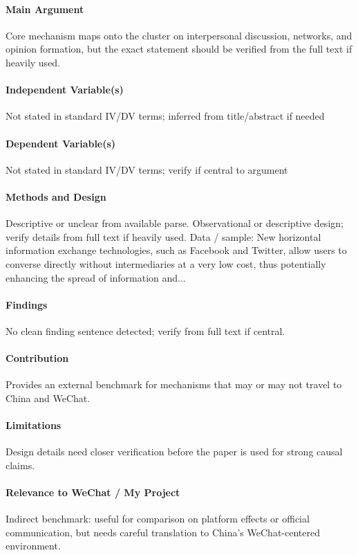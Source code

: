 \documentclass[12pt]{article}
\begin{document}
\paragraph{Main Argument} Core mechanism maps onto the cluster on interpersonal discussion, networks, and opinion formation, but the exact statement should be verified from the full text if heavily used.

\paragraph{Independent Variable(s)} Not stated in standard IV/DV terms; inferred from title/abstract if needed

\paragraph{Dependent Variable(s)} Not stated in standard IV/DV terms; verify if central to argument

\paragraph{Methods and Design} Descriptive or unclear from available parse. Observational or descriptive design; verify details from full text if heavily used. Data / sample: New horizontal information exchange technologies, such as Facebook and Twitter, allow users to converse directly without intermediaries at a very low cost, thus potentially enhancing the spread of information and...

\paragraph{Findings} No clean finding sentence detected; verify from full text if central.

\paragraph{Contribution} Provides an external benchmark for mechanisms that may or may not travel to China and WeChat.

\paragraph{Limitations} Design details need closer verification before the paper is used for strong causal claims.

\paragraph{Relevance to WeChat / My Project} Indirect benchmark: useful for comparison on platform effects or official communication, but needs careful translation to China's WeChat-centered environment.
\end{document}
